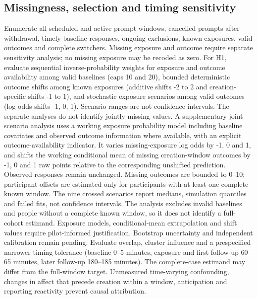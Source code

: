 \documentclass[11pt]{article}
\begin{document}
\subsection{Missingness, selection and timing sensitivity}
Enumerate all scheduled and active prompt windows, cancelled prompts after withdrawal, timely baseline responses, ongoing exclusions, known exposures, valid outcomes and complete switchers. Missing exposure and outcome require separate sensitivity analysis; no missing exposure may be recoded as zero. For H1, evaluate sequential inverse-probability weights for exposure and outcome availability among valid baselines (caps 10 and 20), bounded deterministic outcome shifts among known exposures (additive shifts -2 to 2 and creation-specific shifts -1 to 1), and stochastic exposure scenarios among valid outcomes (log-odds shifts -1, 0, 1). Scenario ranges are not confidence intervals. The separate analyses do not identify jointly missing values. A supplementary joint scenario analysis uses a working exposure probability model including baseline covariates and observed outcome information where available, with an explicit outcome-availability indicator. It varies missing-exposure log odds by -1, 0 and 1, and shifts the working conditional mean of missing creation-window outcomes by -1, 0 and 1 raw points relative to the corresponding unshifted prediction. Observed responses remain unchanged. Missing outcomes are bounded to 0--10; participant offsets are estimated only for participants with at least one complete known window. The nine crossed scenarios report medians, simulation quantiles and failed fits, not confidence intervals. The analysis excludes invalid baselines and people without a complete known window, so it does not identify a full-cohort estimand. Exposure models, conditional-mean extrapolation and shift values require pilot-informed justification. Bootstrap uncertainty and independent calibration remain pending. Evaluate overlap, cluster influence and a prespecified narrower timing tolerance (baseline 0--5 minutes, exposure and first follow-up 60--65 minutes, later follow-up 180--185 minutes). The complete-case estimand may differ from the full-window target. Unmeasured time-varying confounding, changes in affect that precede creation within a window, anticipation and reporting reactivity prevent causal attribution.
\end{document}

